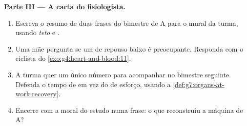 \begin{problem}
\medskip\noindent\textbf{Parte III --- A carta do
fisiologista.}
\begin{enumerate}[resume]
  \item Escreva o resumo de duas frases do bimestre de A para o mural
        da turma, usando \emph{teto} e \emph{}.
  \item Uma mãe pergunta se um  de repouso baixo é preocupante.
        Responda com o ciclista do
        \cref{exo:g4:heart-and-blood:11}.
  \item A turma quer um único número para acompanhar no bimestre
        seguinte. Defenda o tempo de  em vez do  de
        esforço, usando a \cref{def:g7:organs-at-work:recovery}.
  \item Encerre com a moral do estudo numa frase: o que reconstruiu a
        máquina de A?
\end{enumerate}
\end{problem}
